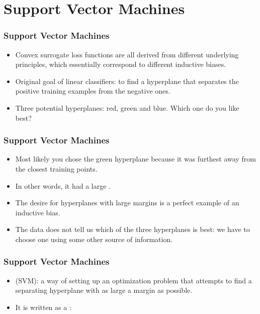\documentclass[trans]{beamer}
\begin{document}
\section{Support Vector Machines} \label{sec:loss:svm}

\begin{frame}
  \frametitle{Support Vector Machines}
\begin{itemize}
\item 
Convex
surrogate loss functions are all derived from different underlying principles,
which essentially correspond to different inductive biases.  
\item
Original goal of linear
classifiers: to find a hyperplane that separates the positive training
examples from the negative ones.
\item Three potential hyperplanes: red, green and blue.  Which
one do you like best?
\end{itemize}
\end{frame}


\begin{frame}
  \frametitle{Support Vector Machines}
\begin{itemize}
\item 
Most likely you chose the green hyperplane because it was furthest away from the closest training points. 
\item In
other words, it had a large . 
\item  The desire for
hyperplanes with large margins is a perfect example of an inductive
bias. 
\item  The data does not tell us which of the three hyperplanes is
best: we have to choose one using some other source of information.
\end{itemize}
\end{frame}


\begin{frame}
  \frametitle{Support Vector Machines}
\begin{itemize}
\item 
  (SVM): a way of setting up an
optimization problem that attempts to find a separating hyperplane
with as large a margin as possible. 
\item  It is written as a
:
%
%
\end{itemize}
\end{frame}
\end{document}
